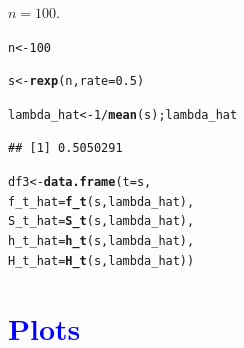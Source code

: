 \documentclass[11pt, a4paper]{article}\usepackage[]{graphicx}\usepackage[]{xcolor}
\makeatletter
\newcommand{\hlnum}[1]{\textcolor[rgb]{0.686,0.059,0.569}{#1}}%
\newcommand{\hlopt}[1]{\textcolor[rgb]{0,0,0}{#1}}%
\newcommand{\hldef}[1]{\textcolor[rgb]{0.345,0.345,0.345}{#1}}%
\newcommand{\hlkwb}[1]{\textcolor[rgb]{0.69,0.353,0.396}{#1}}%
\newcommand{\hlkwc}[1]{\textcolor[rgb]{0.333,0.667,0.333}{#1}}%
\newcommand{\hlkwd}[1]{\textcolor[rgb]{0.737,0.353,0.396}{\textbf{#1}}}%
\newenvironment{kframe}{%
 \def\at@end@of@kframe{}%
 \ifinner\ifhmode%
  \def\at@end@of@kframe{\end{minipage}}%
  \begin{minipage}{\columnwidth}%
 \fi\fi%
 \def\FrameCommand##1{\hskip\@totalleftmargin \hskip-\fboxsep
 \colorbox{shadecolor}{##1}\hskip-\fboxsep
     \hskip-\linewidth \hskip-\@totalleftmargin \hskip\columnwidth}%
 \MakeFramed {\advance\hsize-\width
   \@totalleftmargin\z@ \linewidth\hsize
   \@setminipage}}%
 {\par\unskip\endMakeFramed%
 \at@end@of@kframe}
\newenvironment{knitrout}{}{} %
\makeatother
\begin{document}
 $n = 100$.

\begin{knitrout}
\color{fgcolor}\begin{kframe}
\begin{alltt}
\hldef{n} \hlkwb{<-} \hlnum{100}
\end{alltt}
\end{kframe}
\end{knitrout}

\begin{knitrout}
\color{fgcolor}\begin{kframe}
\begin{alltt}
\hldef{s} \hlkwb{<-} \hlkwd{rexp}\hldef{(n,} \hlkwc{rate} \hldef{=} \hlnum{0.5}\hldef{)}
\end{alltt}
\end{kframe}
\end{knitrout}

\begin{knitrout}
\color{fgcolor}\begin{kframe}
\begin{alltt}
\hldef{lambda_hat} \hlkwb{<-} \hlnum{1} \hlopt{/} \hlkwd{mean}\hldef{(s); lambda_hat}
\end{alltt}
\begin{verbatim}
## [1] 0.5050291
\end{verbatim}
\end{kframe}
\end{knitrout}

\begin{knitrout}
\color{fgcolor}\begin{kframe}
\begin{alltt}
\hldef{df3} \hlkwb{<-} \hlkwd{data.frame}\hldef{(}\hlkwc{t} \hldef{= s,}
                  \hlkwc{f_t_hat} \hldef{=} \hlkwd{f_t}\hldef{(s, lambda_hat),}
                  \hlkwc{S_t_hat} \hldef{=} \hlkwd{S_t}\hldef{(s, lambda_hat),}
                  \hlkwc{h_t_hat} \hldef{=} \hlkwd{h_t}\hldef{(s, lambda_hat),}
                  \hlkwc{H_t_hat} \hldef{=} \hlkwd{H_t}\hldef{(s, lambda_hat))}
\end{alltt}
\end{kframe}
\end{knitrout}

\newpage

\section*{\faArrowAltCircleRight[regular] \textcolor{blue}{Plots}}
\end{document}
